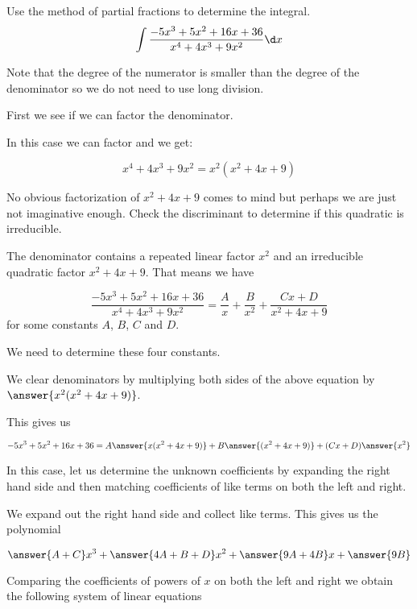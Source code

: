 \documentclass{ximera}
\author{Jim Talamo and Jason Miller}
\begin{document}
\begin{exercise}
Use the method of partial fractions to determine the integral.
\[
\int \frac{-5x^{3}+5x^{2}+16x+36}{x^{4}+4x^{3}+9x^{2}} \d x
\]

Note that the degree of the numerator is smaller than the degree of the denominator so we do not need 
to use long division. 

First we see if we can factor the denominator. 

In this case we can factor and we get:

\[
x^{4}+4x^{3}+9x^{2}=x^{2}(x^{2}+4x+9)
\]

No obvious factorization of $x^{2}+4x+9$ comes to mind but perhaps we are just not imaginative enough. 
Check the discriminant to determine if this quadratic is irreducible. 


  \begin{multipleChoice}
  \end{multipleChoice}

\begin{exercise} 

The denominator contains a repeated linear factor $x^{2}$ and an irreducible quadratic factor $x^{2}+4x+9$. 
That means we have

\[
 \frac{-5x^{3}+5x^{2}+16x+36}{x^{4}+4x^{3}+9x^{2}}= \frac{A}{x} + \frac{B}{x^{2}} +\frac{Cx+D}{x^{2}+4x+9}
\]
for some constants $A$, $B$, $C$ and $D$.

We need to determine these four constants. 

We clear denominators by multiplying both sides of the above equation by $\answer{x^{2}(x^{2}+4x+9)}$. 

This gives us 

\[
-5x^{3}+5x^{2}+16x+36=A\answer{ x(x^{2}+4x+9)} + B\answer{ (x^{2}+4x+9)} +  (Cx+D)\answer{x^{2}}
\]

In this case, let us determine the unknown coefficients by expanding the right hand side and then matching coefficients of like terms on both the left and right. 

We expand out the right hand side and collect like terms. This gives us the polynomial

\[
\answer{A+C}x^{3}+\answer{4A+B+D}x^{2}+\answer{9A+4B}x+\answer{9B}
\]


\begin{exercise}

Comparing the coefficients of powers of $x$ on both the left and right we obtain the following system of linear equations


\end{exercise}
\end{exercise}
\end{exercise}
\end{document}

